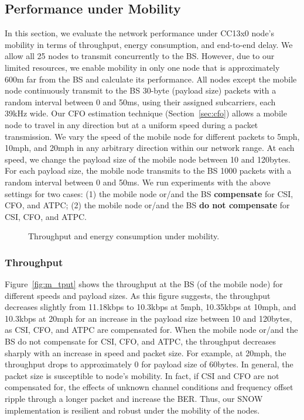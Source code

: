 \subsection{Performance under Mobility}\label{sec:mobility_per}
In this section, we evaluate the network performance under CC13x0 node's mobility in terms of throughput, energy consumption, and end-to-end delay. 
We allow all 25 nodes to transmit concurrently to the BS. However, due to our limited resources, we enable mobility in only one node that is approximately 600m far from the BS and calculate its performance.
All nodes except the mobile node continuously transmit to the BS 30-byte (payload size) packets with a random interval between 0 and 50ms, using their assigned subcarriers, each 39kHz wide. Our CFO estimation technique (Section~\ref{sec:cfo}) allows a mobile node to travel in any direction but at a uniform speed during a packet transmission.
We vary the speed of the mobile node for different packets to 5mph, 10mph, and 20mph in any arbitrary direction within our network range. At each speed, we change the payload size of the mobile node between 10 and 120bytes. For each payload size, the mobile node transmits to the BS 1000 packets with a random interval between 0 and 50ms. We run experiments with the above settings for two cases: (1) the mobile node or/and the BS {\bf compensate} for CSI, CFO, and ATPC; (2) the mobile node or/and the BS {\bf do not compensate} for CSI, CFO, and ATPC.
\begin{figure}[t]
    \centering
      \hfill%
    \caption{Throughput and energy consumption under mobility.}
    \label{fig:mobility}
\end{figure}

\subsubsection{Throughput}
Figure~\ref{fig:m_tput} shows the throughput at the BS (of the mobile node) for different speeds and payload sizes. As this figure suggests, the throughput decreases slightly from 11.18kbps to 10.3kbps at 5mph, 10.35kbps at 10mph, and 10.3kbps at 20mph for an increase in the payload size between 10 and 120bytes, as CSI, CFO, and ATPC are compensated for. When the mobile node or/and the BS do not compensate for CSI, CFO, and ATPC, the throughput decreases sharply with an increase in speed and packet size. For example, at 20mph, the throughput drops to approximately 0 for payload size of 60bytes. In general, the packet size is susceptible to node's mobility. In fact, if CSI and CFO are not compensated for, the effects of unknown channel conditions and frequency offset ripple through a longer packet and increase the BER. Thus, our SNOW implementation is resilient and robust under the mobility of the nodes.

